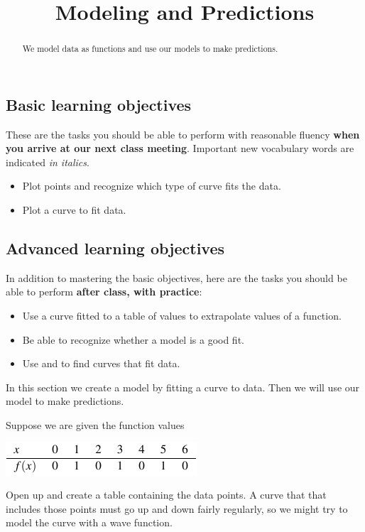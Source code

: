 \documentclass{ximera}
\title{Modeling and Predictions}
\begin{document}
\begin{abstract}
We model data as functions and use our models to make predictions.
\end{abstract}
\maketitle

\subsection*{Basic learning objectives}

These are the tasks you should be able to perform with reasonable fluency \textbf{when you arrive at our next class meeting}. Important new vocabulary words are indicated \emph{in italics}. 

\begin{itemize}
	\item Plot points and recognize which type of curve fits the data.
	\item Plot a curve to fit data.
\end{itemize}

\subsection*{Advanced learning objectives}

In addition to mastering the basic objectives, here are the tasks you should be able to perform \textbf{after class, with practice}: 

\begin{itemize}
	\item Use a curve fitted to a table of values to extrapolate values of a function.
    \item Be able to recognize whether a model is a good fit.
    \item Use  and  to find curves that fit data.
\end{itemize}

\noindent\hrulefill

In this section we create a model by fitting a curve to data. Then we will use our model to make predictions.

Suppose we are given the function values 
\begin{image}
\includegraphics{ModelingTable1.png}
\end{image}
Open up  and create a table containing the data points. A curve that that includes those points must go up and down fairly regularly, so we might try to model the curve with a wave function.
\end{document}
